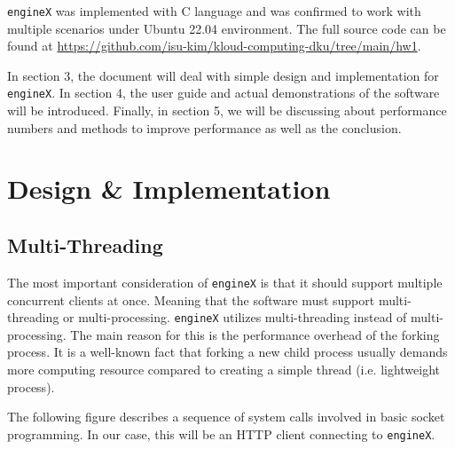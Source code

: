 \documentclass{homework}
\begin{document}
\texttt{engineX} was implemented with C language and was confirmed to work with multiple scenarios under Ubuntu 22.04 environment. The full source code can be found at \href{https://github.com/isu-kim/kloud-computing-dku/tree/main/hw1}{https://github.com/isu-kim/kloud-computing-dku/tree/main/hw1}.

In section 3, the document will deal with simple design and implementation for \texttt{engineX}. In section 4, the user guide and actual demonstrations of the software will be introduced. Finally, in section 5, we will be discussing about performance numbers and methods to improve performance as well as the conclusion.

\section{Design \& Implementation}
\subsection{Multi-Threading}
The most important consideration of \texttt{engineX} is that it should support multiple concurrent clients at once. Meaning that the software must support multi-threading or multi-processing. \texttt{engineX} utilizes multi-threading instead of multi-processing. The main reason for this is the performance overhead of the forking process. It is a well-known fact that forking a new child process usually demands more computing resource compared to creating a simple thread (i.e. lightweight process). 

The following figure describes a sequence of system calls involved in basic socket programming. In our case, this will be an HTTP client connecting to \texttt{engineX}.
\end{document}
